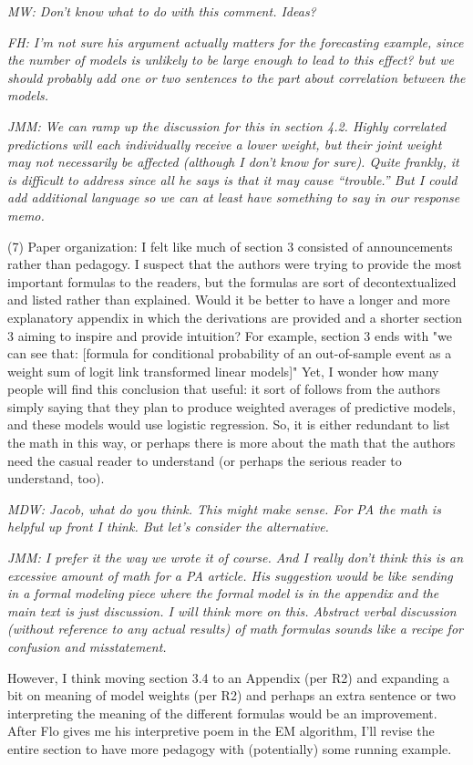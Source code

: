 \documentclass[10pt]{article}
\begin{document}
{\it MW: Don't know what to do with this comment. Ideas?}

{\it FH: I'm not sure his argument actually matters for the forecasting example, since the number of models is unlikely to be large enough to lead to this effect? but we should probably add one or two sentences to the part about correlation between the models.}

{\it JMM: We can ramp up the discussion for this in section 4.2.  Highly correlated predictions will each individually receive a lower weight, but their joint weight may not necessarily be affected (although I don't know for sure).  Quite frankly, it is difficult to address since all he says is that it may cause ``trouble.''  But I could add additional language so we can at least have something to say in our response memo.}


(7) Paper organization: I felt like much of section 3 consisted of
announcements rather than pedagogy. I suspect that the authors were
trying to provide the most important formulas to the readers, but the
formulas are sort of decontextualized and listed rather than
explained. Would it be better to have a longer and more explanatory
appendix in which the derivations are provided and a shorter section 3
aiming to inspire and provide intuition? For example, section 3 ends
with "we can see that: [formula for conditional probability of an
out-of-sample event as a weight sum of logit link transformed linear
models]" Yet, I wonder how many people will find this conclusion that
useful: it sort of follows from the authors simply saying that they
plan to produce weighted averages of predictive models, and these
models would use logistic regression. So, it is either redundant to
list the math in this way, or perhaps there is more about the math
that the authors need the casual reader to understand (or perhaps the
serious reader to understand, too).

{\it MDW: Jacob, what do you think. This might make sense. For PA the math is helpful up front I think. But let's consider the alternative.}

{\it JMM:  I prefer it the way we wrote it of course.  And I really don't think this is an excessive amount of math for a PA article.   His suggestion would be like sending in a formal modeling piece where the formal model is in the appendix and the main text is just discussion.  I will think more on this.   Abstract verbal discussion (without reference to any actual results) of math formulas sounds like a recipe for confusion and misstatement.

However, I think moving section 3.4 to an Appendix (per R2) and expanding a bit on meaning of model weights (per R2) and perhaps an extra sentence or two interpreting the meaning of the different formulas would be an improvement.  After Flo gives me his interpretive poem in the EM algorithm, I'll revise the entire section to have more pedagogy with (potentially) some running example. }
\end{document}
